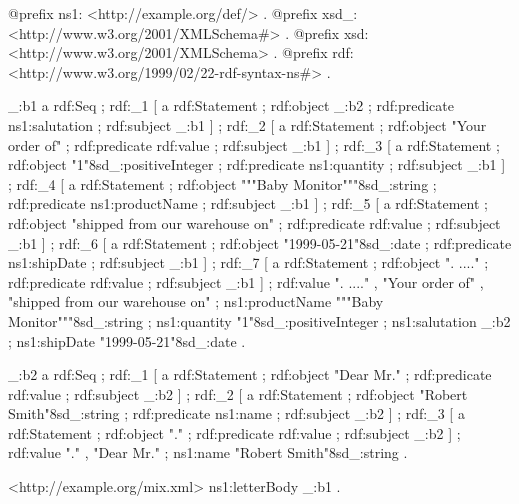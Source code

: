 \begin{DoxyCodeInclude}
@prefix ns1:     <http://example.org/def/> .
@prefix xsd_:    <http://www.w3.org/2001/XMLSchema#> .
@prefix xsd:     <http://www.w3.org/2001/XMLSchema> .
@prefix rdf:     <http://www.w3.org/1999/02/22-rdf-syntax-ns#> .

_:b1  a       rdf:Seq ;
      rdf:_1  [ a       rdf:Statement ;
                rdf:object _:b2 ;
                rdf:predicate ns1:salutation ;
                rdf:subject _:b1
              ] ;
      rdf:_2  [ a       rdf:Statement ;
                rdf:object "Your order of" ;
                rdf:predicate rdf:value ;
                rdf:subject _:b1
              ] ;
      rdf:_3  [ a       rdf:Statement ;
                rdf:object "1"^^xsd_:positiveInteger ;
                rdf:predicate ns1:quantity ;
                rdf:subject _:b1
              ] ;
      rdf:_4  [ a       rdf:Statement ;
                rdf:object """Baby
Monitor"""^^xsd_:string ;
                rdf:predicate ns1:productName ;
                rdf:subject _:b1
              ] ;
      rdf:_5  [ a       rdf:Statement ;
                rdf:object "shipped from our warehouse on" ;
                rdf:predicate rdf:value ;
                rdf:subject _:b1
              ] ;
      rdf:_6  [ a       rdf:Statement ;
                rdf:object "1999-05-21"^^xsd_:date ;
                rdf:predicate ns1:shipDate ;
                rdf:subject _:b1
              ] ;
      rdf:_7  [ a       rdf:Statement ;
                rdf:object ". ...." ;
                rdf:predicate rdf:value ;
                rdf:subject _:b1
              ] ;
      rdf:value ". ...." , "Your order of" , "shipped from our warehouse on" ;
      ns1:productName """Baby
Monitor"""^^xsd_:string ;
      ns1:quantity "1"^^xsd_:positiveInteger ;
      ns1:salutation _:b2 ;
      ns1:shipDate "1999-05-21"^^xsd_:date .

_:b2  a       rdf:Seq ;
      rdf:_1  [ a       rdf:Statement ;
                rdf:object "Dear Mr." ;
                rdf:predicate rdf:value ;
                rdf:subject _:b2
              ] ;
      rdf:_2  [ a       rdf:Statement ;
                rdf:object "Robert Smith"^^xsd_:string ;
                rdf:predicate ns1:name ;
                rdf:subject _:b2
              ] ;
      rdf:_3  [ a       rdf:Statement ;
                rdf:object "." ;
                rdf:predicate rdf:value ;
                rdf:subject _:b2
              ] ;
      rdf:value "." , "Dear Mr." ;
      ns1:name "Robert Smith"^^xsd_:string .

<http://example.org/mix.xml>
      ns1:letterBody _:b1 .
\end{DoxyCodeInclude}
 